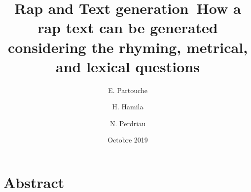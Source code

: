 \documentclass[12pt,a4paper]{article}
\title{Rap and Text generation\newline\ How a rap text can be generated considering the rhyming, metrical, and lexical questions}
\date{Octobre 2019}
\author{E. Partouche \and H. Hamila \and N. Perdriau}
\begin{document}
\maketitle
\tableofcontents
\newpage

\section{Abstract}
\end{document}
